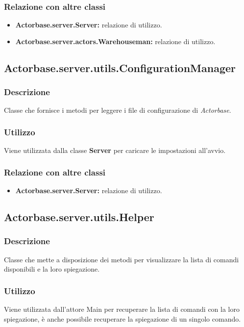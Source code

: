 \documentclass[a4paper]{article}
\begin{document}
			\subsubsection{Relazione con altre classi}
				\begin{itemize}
					\item \textbf{Actorbase.server.Server:} relazione di utilizzo.
					\item \textbf{Actorbase.server.actors.Warehouseman:} relazione di utilizzo.
				\end{itemize}
				
				\subsection{Actorbase.server.utils.ConfigurationManager}
			\subsubsection{Descrizione}
				Classe che fornisce i metodi per leggere i file di configurazione di \emph{Actorbase}.
				
			\subsubsection{Utilizzo}
				Viene utilizzata dalla classe \textbf{Server} per caricare le impostazioni all'avvio.
				
			\subsubsection{Relazione con altre classi}
				\begin{itemize}
					\item \textbf{Actorbase.server.Server:} relazione di utilizzo.
				\end{itemize}
				
		\subsection{Actorbase.server.utils.Helper}
			\subsubsection{Descrizione}
				Classe che mette a disposizione dei metodi per visualizzare la lista di comandi disponibili e la loro spiegazione.
				
			\subsubsection{Utilizzo}
				Viene utilizzata dall'attore\ped{\emph{G}} Main per recuperare la lista di comandi con la loro spiegazione, è anche possibile recuperare 
				la spiegazione di un singolo comando.
				
\end{document}
